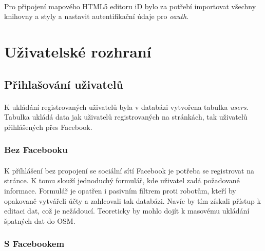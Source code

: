 \documentclass[11pt,a4paper,titlepage,oneside]{book}
\begin{document}
			\paragraph{}Pro připojení mapového HTML5 editoru iD bylo za potřebí importovat všechny knihovny a styly a nastavit autentifikační údaje pro \textit{oauth}. 

			
		\section{Uživatelské rozhraní}
			\subsection{Přihlašování uživatelů}


				\paragraph{}K ukládání registrovaných uživatelů byla v databázi vytvořena tabulka \textit{users}. Tabulka ukládá data jak uživatelů registrovaných na stránkách, tak uživatelů přihlášených přes Facebook.
				\subsubsection{Bez Facebooku}


					\paragraph{} K příhlášení bez propojení se sociální sítí Facebook je potřeba se registrovat na stránce. K tomu slouží jednoduchý formulář, kde uživatel zadá požadované informace. Formulář je opatřen i pasivním filtrem proti robotům, kteří by opakovaně vytvářeli účty a zahlcovali tak databázi. Navíc by tím získali přístup k editaci dat, což je nežádoucí. Teoreticky by mohlo dojít k masovému ukládání špatných dat do OSM. 
				\subsubsection{S Facebookem}

\end{document}
